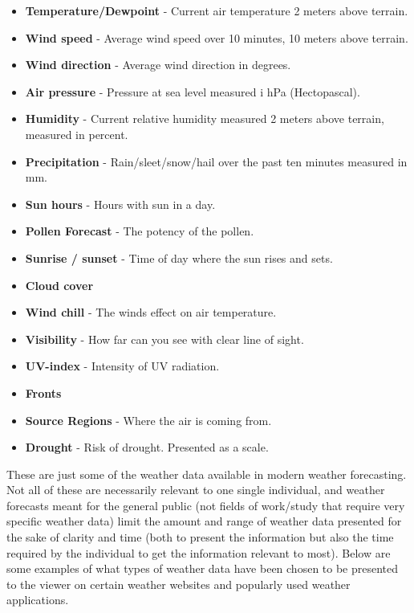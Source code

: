 \begin{itemize}
     \item \textbf{Temperature/Dewpoint} - Current air temperature 2 meters above terrain.
     \item \textbf{Wind speed} - Average wind speed over 10 minutes, 10 meters above terrain.
     \item \textbf{Wind direction} - Average wind direction in degrees.
     \item \textbf{Air pressure} - Pressure at sea level measured i hPa (Hectopascal).
     \item \textbf{Humidity} - Current relative humidity measured 2 meters above terrain, measured in percent.
     \item \textbf{Precipitation} - Rain/sleet/snow/hail over the past ten minutes measured in mm.
     \item \textbf{Sun hours} - Hours with sun in a day.
     \item \textbf{Pollen Forecast} - The potency of the pollen. 
     \item \textbf{Sunrise / sunset} - Time of day where the sun rises and sets.
     \item \textbf{Cloud cover}
     \item \textbf{Wind chill} - The winds effect on air temperature.
     \item \textbf{Visibility} - How far can you see with clear line of sight.
     \item \textbf{UV-index} - Intensity of UV radiation.
     \item \textbf{Fronts} 
     \item \textbf{Source Regions} - Where the air is coming from.
     \item \textbf{Drought} - Risk of drought. Presented as a scale.
 \end{itemize}

These are just some of the weather data available in modern weather forecasting. 
Not all of these are necessarily relevant to one single individual, and weather forecasts meant for the general public (not fields of work/study that require very specific weather data) limit the amount and range of weather data presented for the sake of clarity and time (both to present the information but also the time required by the individual to get the information relevant to most). 
Below are some examples of what types of weather data have been chosen to be presented to the viewer on certain weather websites and popularly used weather applications.

